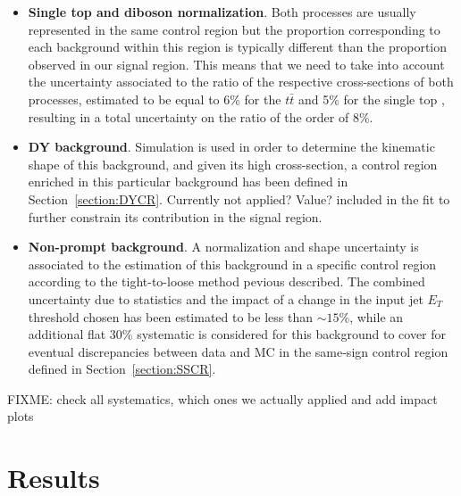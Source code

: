 \documentclass[a4paper, 10pt, openright]{report}
\begin{document}
\begin{itemize}
\item \textbf{Single top and diboson normalization}. Both processes are usually represented in the same control region but the proportion corresponding to each background within this region is typically different than the proportion observed in our signal region. This means that we need to take into account the uncertainty associated to the ratio of the respective cross-sections of both processes, estimated to be equal to 6\% for the $t \bar t$ \cite{ttbarXS} and 5\% for the single top \cite{singletopXS}, resulting in a total uncertainty on the ratio of the order of 8\%.
\item \textbf{\acf{DY} background}. Simulation is used in order to determine the kinematic shape of this background, and given its high cross-section, a control region enriched in this particular background has been defined in Section~\ref{section:DYCR}. \color{red} Currently not applied? Value? \color{black}
included in the fit to further constrain its contribution in the signal region.
\item \textbf{Non-prompt background}. A normalization and shape uncertainty is associated to the estimation of this background in a specific control region according to the tight-to-loose method pevious described. The combined uncertainty due to statistics and the impact of a change in the input jet $E_T$ threshold chosen has been estimated to be less than $\sim15$\%, while an additional flat 30\% systematic is considered for this background to cover for eventual discrepancies between data and \ac{MC} in the same-sign control region defined in Section~\ref{section:SSCR}.
\end{itemize}

\color{red} FIXME: check all systematics, which ones we actually applied and add impact plots \color{black}

\section{Results} \label{section:Results}
\end{document}
